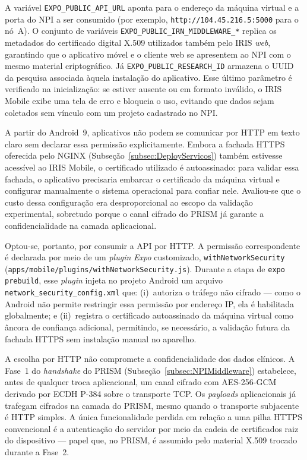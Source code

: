 A variável \texttt{EXPO\_PUBLIC\_API\_URL} aponta para o endereço da máquina virtual e a porta do NPI a ser consumido (por exemplo, \texttt{http://104.45.216.5:5000} para o nó~A). O conjunto de variáveis \texttt{EXPO\_PUBLIC\_IRN\_MIDDLEWARE\_*} replica os metadados do certificado digital X.509 utilizados também pelo IRIS \emph{web}, garantindo que o aplicativo móvel e o cliente web se apresentem ao NPI com o mesmo material criptográfico. Já \texttt{EXPO\_PUBLIC\_RESEARCH\_ID} armazena o UUID da pesquisa associada àquela instalação do aplicativo. Esse último parâmetro é verificado na inicialização: se estiver ausente ou em formato inválido, o IRIS Mobile exibe uma tela de erro e bloqueia o uso, evitando que dados sejam coletados sem vínculo com um projeto cadastrado no NPI.

A partir do Android~9, aplicativos não podem se comunicar por HTTP em texto claro sem declarar essa permissão explicitamente. Embora a fachada HTTPS oferecida pelo NGINX (Subseção~\ref{subsec:DeployServicos}) também estivesse acessível ao IRIS Mobile, o certificado utilizado é autoassinado: para validar essa fachada, o aplicativo precisaria embarcar o certificado da máquina virtual e configurar manualmente o sistema operacional para confiar nele. Avaliou-se que o custo dessa configuração era desproporcional ao escopo da validação experimental, sobretudo porque o canal cifrado do PRISM já garante a confidencialidade na camada aplicacional.

Optou-se, portanto, por consumir a API por HTTP. A permissão correspondente é declarada por meio de um \emph{plugin} \emph{Expo} customizado, \texttt{withNetworkSecurity} (\texttt{apps/mobile/plugins/withNetworkSecurity.js}). Durante a etapa de \texttt{expo prebuild}, esse \emph{plugin} injeta no projeto Android um arquivo \texttt{network\_security\_config.xml} que: (i)~autoriza o tráfego não cifrado --- como o Android não permite restringir essa permissão por endereço IP, ela é habilitada globalmente; e (ii)~registra o certificado autoassinado da máquina virtual como âncora de confiança adicional, permitindo, se necessário, a validação futura da fachada HTTPS sem instalação manual no aparelho.

A escolha por HTTP não compromete a confidencialidade dos dados clínicos. A Fase~1 do \emph{handshake} do PRISM (Subseção~\ref{subsec:NPIMiddleware}) estabelece, antes de qualquer troca aplicacional, um canal cifrado com AES-256-GCM derivado por ECDH P-384 sobre o transporte TCP. Os \emph{payloads} aplicacionais já trafegam cifrados na camada do PRISM, mesmo quando o transporte subjacente é HTTP simples. A única funcionalidade perdida em relação a uma pilha HTTPS convencional é a autenticação do servidor por meio da cadeia de certificados raiz do dispositivo --- papel que, no PRISM, é assumido pelo material X.509 trocado durante a Fase~2.

